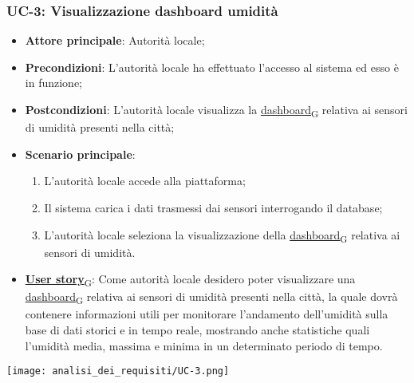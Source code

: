 \subsubsection{UC-3: Visualizzazione dashboard umidità}
\begin{itemize}
	\item \textbf{Attore principale}: Autorità locale;
	\item \textbf{Precondizioni}: L'autorità locale ha effettuato l'accesso al sistema ed esso è in funzione;
	\item \textbf{Postcondizioni}: L'autorità locale visualizza la \href{https://7last.github.io/docs/rtb/documentazione-interna/glossario\#dashboard}{dashboard\textsubscript{G}} relativa
	      ai sensori di umidità presenti nella città;
	\item \textbf{Scenario principale}:
	      \begin{enumerate}
		      \item L'autorità locale accede alla piattaforma;
		      \item Il sistema carica i dati trasmessi dai sensori interrogando il database;
		      \item L'autorità locale seleziona la visualizzazione della \href{https://7last.github.io/docs/rtb/documentazione-interna/glossario\#dashboard}{dashboard\textsubscript{G}} relativa ai sensori di umidità.
	      \end{enumerate}
	\item \href{https://7last.github.io/docs/rtb/documentazione-interna/glossario\#user-story}{\textbf{User story}\textsubscript{G}}:
	      Come autorità locale desidero poter visualizzare una \href{https://7last.github.io/docs/rtb/documentazione-interna/glossario\#dashboard}{dashboard\textsubscript{G}} relativa ai sensori di umidità presenti nella città, la quale
	      dovrà contenere informazioni utili per monitorare l'andamento dell'umidità sulla base di dati storici e in tempo reale, mostrando
	      anche statistiche quali l'umidità media, massima e minima in un determinato periodo di tempo.
\end{itemize}
\begin{center}
	\texttt{[image: analisi\_dei\_requisiti/UC-3.png]}
\end{center}

